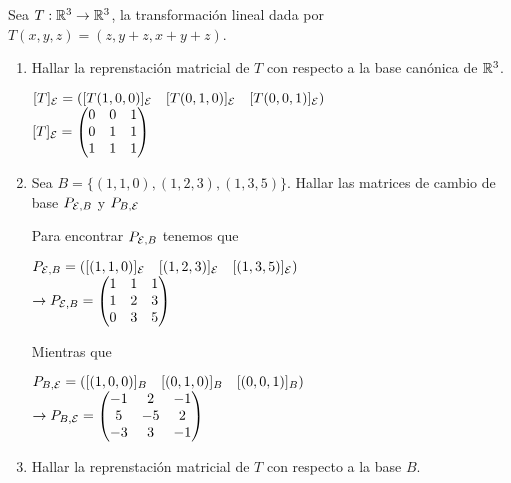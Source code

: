 \item Sea $T:\mathbb{R}^3\to\mathbb{R}^3$, la transformación lineal dada por $T(x,y,z)=(z,y+z,x+y+z)$.
    \begin{enumerate}
        \item Hallar la reprenstación matricial de $T$ con respecto a la base canónica de $\mathbb{R}^3$.
            \begin{mdframed}[style=s]
                \begin{center}
                    $[T]_{\mathcal{E}}=\left([T(1,0,0)]_{\mathcal{E}}\quad[T(0,1,0)]_{\mathcal{E}}\quad[T(0,0,1)]_{\mathcal{E}}\right)$\\
                    $[T]_{\mathcal{E}}=\begin{pmatrix}
                        0&0&1\\0&1&1\\1&1&1
                    \end{pmatrix}$
                \end{center}
            \end{mdframed}
        \item Sea $B=\{(1,1,0),(1,2,3),(1,3,5)\}$. Hallar las matrices de cambio de base $P_{\mathcal{E},B}$ y $P_{B,\mathcal{E}}$
            \begin{mdframed}[style=s]
                Para encontrar $P_{\mathcal{E},B}$ tenemos que
                \begin{center}
                    $P_{\mathcal{E},B}=\left([(1,1,0)]_{\mathcal{E}}\quad[(1,2,3)]_{\mathcal{E}}\quad[(1,3,5)]_{\mathcal{E}}\right)$\\
                    $\to P_{\mathcal{E},B}=\begin{pmatrix}
                        1&1&1\\1&2&3\\0&3&5
                    \end{pmatrix}$
                \end{center}
                Mientras que
                \begin{center}
                    $P_{B,\mathcal{E}}=\left([(1,0,0)]_B\quad[(0,1,0)]_B\quad[(0,0,1)]_B\right)$\\
                    $\to P_{B,\mathcal{E}}=\begin{pmatrix}
                        -1&2&-1\\5&-5&2\\-3&3&-1
                    \end{pmatrix}$
                \end{center}
            \end{mdframed}
        \item Hallar la reprenstación matricial de $T$ con respecto a la base $B$.

\end{enumerate}
